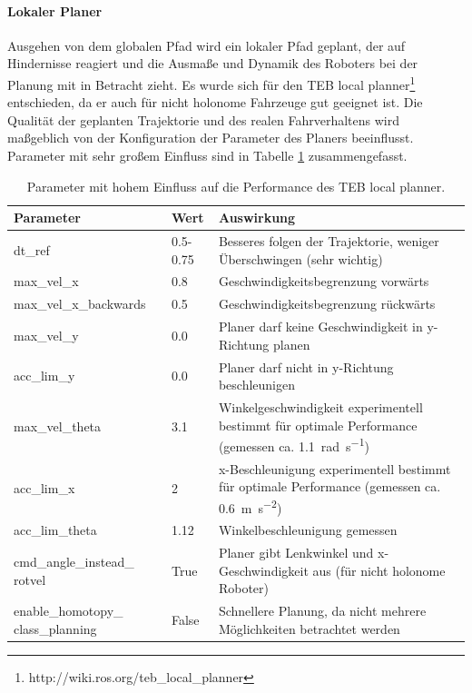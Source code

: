 \paragraph{Lokaler Planer}
Ausgehen von dem globalen Pfad wird ein lokaler Pfad geplant, der auf Hindernisse reagiert und die Ausma\ss{}e und Dynamik des Roboters bei der Planung mit in Betracht zieht. Es wurde sich f\"ur den TEB local planner\footnote{http://wiki.ros.org/teb\_local\_planner} entschieden, da er auch f\"ur nicht holonome Fahrzeuge gut geeignet ist. Die Qualit\"at der geplanten Trajektorie und des realen Fahrverhaltens wird ma\ss{}geblich von der Konfiguration der Parameter des Planers beeinflusst. Parameter mit sehr gro\ss{}em Einfluss sind in Tabelle \ref{tab:TEB} zusammengefasst.

\begin{table}[h]
	\centering
	\renewcommand{\arraystretch}{1.2}
	\begin{tabular}{p{4cm}l p{9cm}}
		Parameter & Wert  & Auswirkung \\ \hline
		dt\_ref & 0.5-0.75 & Besseres folgen der Trajektorie, weniger \"Uberschwingen (sehr wichtig)\\ 
		max\_vel\_x & 0.8 & Geschwindigkeitsbegrenzung vorw\"arts\\
		max\_vel\_x\_backwards & 0.5 & Geschwindigkeitsbegrenzung r\"uckw\"arts\\
		max\_vel\_y & 0.0 & Planer darf keine Geschwindigkeit in y-Richtung planen\\
		acc\_lim\_y & 0.0 & Planer darf nicht in y-Richtung beschleunigen\\
		max\_vel\_theta & 3.1 & Winkelgeschwindigkeit experimentell bestimmt f\"ur optimale Performance (gemessen ca. \SI[per-mode=fraction]{1.1}{\radian\per\second})\\
		acc\_lim\_x & 2 & x-Beschleunigung experimentell bestimmt f\"ur optimale Performance (gemessen ca. \SI[per-mode=fraction]{0.6}{\meter\per\second\squared})\\
		acc\_lim\_theta& 1.12 & Winkelbeschleunigung gemessen\\
		cmd\_angle\_instead\_ rotvel & True & Planer gibt Lenkwinkel und x-Geschwindigkeit aus (f\"ur nicht holonome Roboter) \\
		enable\_homotopy\_ class\_planning & False & Schnellere Planung, da nicht mehrere M\"oglichkeiten betrachtet werden
	\end{tabular}
	\caption{Parameter mit hohem Einfluss auf die Performance des TEB local planner.}
	\label{tab:TEB}
\end{table}

